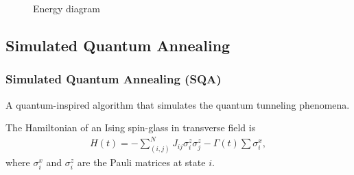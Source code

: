 \documentclass[11pt,compress,mathserif]{beamer}
\begin{document}
\begin{frame}
\begin{figure}[H]
\centering  
{}
\vspace{-0.3cm}
\caption{Energy diagram}
\label{Fig.main}
\end{figure}

\end{frame}


\subsection[SQA]{Simulated Quantum Annealing}

\begin{frame}\frametitle{Simulated Quantum Annealing (SQA)}

\bit

\item A quantum-inspired algorithm that simulates the quantum tunneling phenomena.

\item The Hamiltonian of an Ising spin-glass in transverse field is
\begin{align}
\label{eq2}
    H(t)=-\sum_{(i, j)}^N J_{i j} \sigma_{i}^{z} \sigma_{j}^{z} -\Gamma(t) \sum \sigma_{i}^{x},
\end{align}
where $\sigma_{i}^{x}$ and $\sigma_{i}^{z}$ are the Pauli matrices at state $i$. %
\eit

\end{frame}
\end{document}

